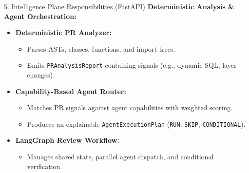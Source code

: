 \documentclass[aspectratio=169,11pt]{beamer}
\begin{document}
\begin{frame}{5. Intelligence Plane Responsibilities (FastAPI)}
  \textbf{Deterministic Analysis \& Agent Orchestration:}
  \vspace{0.25cm}
  \begin{itemize}
    \item \textbf{Deterministic PR Analyzer:}
      \begin{itemize}
        \item Parses ASTs, classes, functions, and import trees.
        \item Emits \texttt{PRAnalysisReport} containing signals (e.g., dynamic SQL, layer changes).
      \end{itemize}
    \vspace{0.2cm}
    \item \textbf{Capability-Based Agent Router:}
      \begin{itemize}
        \item Matches PR signals against agent capabilities with weighted scoring.
        \item Produces an explainable \texttt{AgentExecutionPlan} (\texttt{RUN}, \texttt{SKIP}, \texttt{CONDITIONAL}).
      \end{itemize}
    \vspace{0.2cm}
    \item \textbf{LangGraph Review Workflow:}
      \begin{itemize}
        \item Manages shared state, parallel agent dispatch, and conditional verification.
      \end{itemize}
  \end{itemize}
\end{frame}
\end{document}
